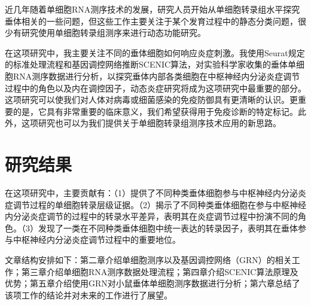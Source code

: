   近几年随着单细胞RNA测序技术的发展\cite{svensson2018exponential}，研究人员开始从单细胞转录组水平探究垂体相关的一些问题\cite{chen2020single,cheung2018single,ho2020single,fletcher2019cell}，但这些工作主要关注于某个发育过程中的静态分类问题，很少有研究使用单细胞转录组测序来进行动态功能研究。

  在这项研究中，我主要关注不同的垂体细胞如何响应炎症刺激。我使用Seurat\cite{butler2018integrating,stuart2019comprehensive}规定的标准处理流程和基因调控网络推断SCENIC\cite{aibar2017scenic,van2020scalable}算法，对实验科学家收集的垂体单细胞RNA测序数据进行分析，以探究垂体内部各类细胞在中枢神经内分泌炎症调节过程中的角色以及内在调控因子，动态炎症研究将成为这项研究中最重要的部分。这项研究可以使我们对人体对病毒或细菌感染的免疫防御具有更清晰的认识。更重要的是，它具有非常重要的临床意义，我们希望获得用于免疫诊断的特定标记。此外，这项研究也可以为我们提供关于单细胞转录组测序技术应用的新思路。

\section{研究结果}
  在这项研究中，主要贡献有：（1）提供了不同种类垂体细胞参与中枢神经内分泌炎症调节过程的单细胞转录层级证据。（2）揭示了不同种类垂体细胞在参与中枢神经内分泌炎症调节的过程中的转录水平差异，表明其在炎症调节过程中扮演不同的角色。（3）发现了一类在不同种类垂体细胞中统一表达的转录因子，表明其在垂体参与中枢神经内分泌炎症调节过程中的重要地位。

  文章结构安排如下：第二章介绍单细胞测序以及基因调控网络（GRN）的相关工作；第三章介绍单细胞RNA测序数据处理流程；第四章介绍SCENIC算法原理及优势；第五章介绍使用GRN对小鼠垂体单细胞测序数据进行分析；第六章总结了该项工作的结论并对未来的工作进行了展望。

